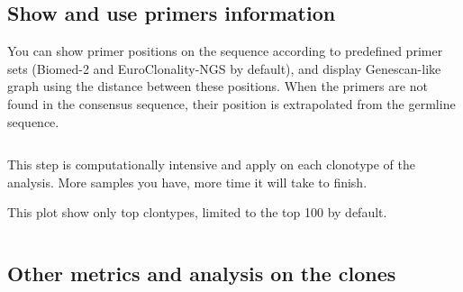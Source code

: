 \subsection{Show and use primers information}

You can show primer positions on the sequence according to predefined primer sets 
(Biomed-2 and EuroClonality-NGS by default), and display Genescan-like graph 
using the distance between these positions.
When the primers are not found in the consensus sequence, their position is
extrapolated from the germline sequence.



\begin{verbatim}
\end{verbatim}

This step is computationally intensive and apply on each clonotype of the analysis.
More samples you have, more time it will take to finish.


This plot show only top clontypes, limited to the top 100 by default.



\begin{verbatim}
\end{verbatim}



\subsection{Other metrics and analysis on the clones}

